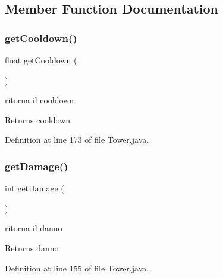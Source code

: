 \subsection{Member Function Documentation}
\mbox{\label{classtowers_1_1_tower_a38fbb6ebbb9c41c0c8d2d62910ac102a}} 
\subsubsection{\texorpdfstring{get\+Cooldown()}{getCooldown()}}
{\footnotesize\ttfamily float get\+Cooldown (\begin{DoxyParamCaption}{ }\end{DoxyParamCaption})}



ritorna il cooldown 

\begin{DoxyReturn}{Returns}
cooldown 
\end{DoxyReturn}


Definition at line 173 of file Tower.\+java.

\mbox{\label{classtowers_1_1_tower_ac10b854131d21646691dcdd7da559a22}} 
\subsubsection{\texorpdfstring{get\+Damage()}{getDamage()}}
{\footnotesize\ttfamily int get\+Damage (\begin{DoxyParamCaption}{ }\end{DoxyParamCaption})}



ritorna il danno 

\begin{DoxyReturn}{Returns}
danno 
\end{DoxyReturn}


Definition at line 155 of file Tower.\+java.

